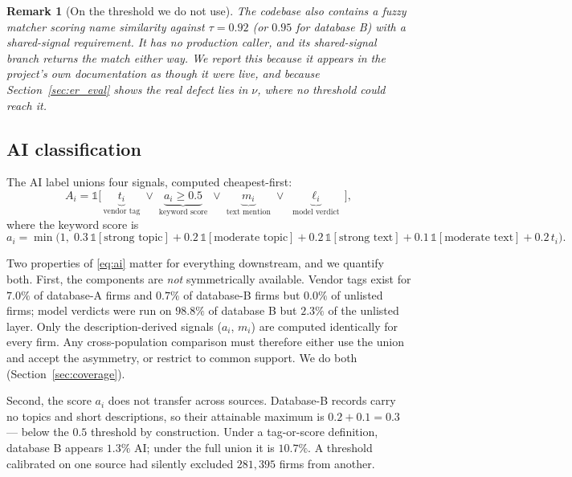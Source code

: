 \documentclass[11pt]{article}
\newtheorem{remark}{Remark}
\begin{document}
\begin{remark}[On the threshold we do not use]
The codebase also contains a fuzzy matcher scoring name similarity against
$\tau = 0.92$ (or $0.95$ for database B) with a shared-signal requirement. It
has no production caller, and its shared-signal branch returns the match
either way. We report this because it appears in the project's own
documentation as though it were live, and because Section~\ref{sec:er_eval}
shows the real defect lies in $\nu$, where no threshold could reach it.
\end{remark}

\subsection{AI classification}
\label{sec:aiclass}

The AI label unions four signals, computed cheapest-first:
\begin{equation}
\label{eq:ai}
A_i = \mathbb{1}\big[\,\underbrace{t_i}_{\text{vendor tag}} \;\vee\;
\underbrace{a_i \ge 0.5}_{\text{keyword score}} \;\vee\;
\underbrace{m_i}_{\text{text mention}} \;\vee\;
\underbrace{\ell_i}_{\text{model verdict}}\,\big],
\end{equation}
where the keyword score is
\begin{equation}
a_i = \min\big(1,\; 0.3\,\mathbb{1}[\text{strong topic}] + 0.2\,\mathbb{1}[\text{moderate topic}]
+ 0.2\,\mathbb{1}[\text{strong text}] + 0.1\,\mathbb{1}[\text{moderate text}]
+ 0.2\,t_i\big).
\end{equation}

Two properties of \eqref{eq:ai} matter for everything downstream, and we
quantify both. First, the components are \emph{not} symmetrically available.
Vendor tags exist for $7.0\%$ of database-A firms and $0.7\%$ of database-B
firms but $0.0\%$ of unlisted firms; model verdicts were run on $98.8\%$ of
database B but $2.3\%$ of the unlisted layer. Only the description-derived
signals ($a_i$, $m_i$) are computed identically for every firm. Any
cross-population comparison must therefore either use the union and accept the
asymmetry, or restrict to common support. We do both
(Section~\ref{sec:coverage}).

Second, the score $a_i$ does not transfer across sources. Database-B records
carry no topics and short descriptions, so their attainable maximum is
$0.2 + 0.1 = 0.3$ --- below the $0.5$ threshold by construction. Under a
tag-or-score definition, database B appears $1.3\%$ AI; under the full union it
is $10.7\%$. A threshold calibrated on one source had silently excluded
$281{,}395$ firms from another.
\end{document}
